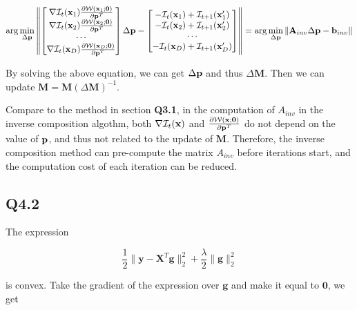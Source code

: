 \documentclass[11pt]{article}
\begin{document}
\begin{equation} \label{inverse_optimization_object}
    \arg\min_{\Delta \mathbf{p}}
    \left \|
    \begin{bmatrix}
        \nabla \mathcal{I}_{t}(\mathbf{x}_1) \frac{\partial\mathcal{W}(\mathbf{x}_1;\mathbf{0})}{\partial \mathbf{p}^T} \\
        \nabla \mathcal{I}_{t}(\mathbf{x}_2) \frac{\partial\mathcal{W}(\mathbf{x}_2;\mathbf{0})}{\partial \mathbf{p}^T} \\
        \cdots\\
        \nabla \mathcal{I}_{t}(\mathbf{x}_D) \frac{\partial\mathcal{W}(\mathbf{x}_D;\mathbf{0})}{\partial \mathbf{p}^T}
    \end{bmatrix}
    \Delta \mathbf{p} -
    \begin{bmatrix}
        - \mathcal{I}_t(\mathbf{x}_1) + \mathcal{I}_{t+1} (\mathbf{x}_1')\\
        - \mathcal{I}_t(\mathbf{x}_2) + \mathcal{I}_{t+1} (\mathbf{x}_2')\\
        \cdots\\
        - \mathcal{I}_t(\mathbf{x}_D) + \mathcal{I}_{t+1} (\mathbf{x}_D')\\
    \end{bmatrix}
    \right \|
    =
    \arg\min_{\Delta \mathbf{p}}
    \| \mathbf{A}_{inv}\Delta\mathbf{p} - \mathbf{b}_{inv} \|
\end{equation}

By solving the above equation, we can get $\Delta \mathbf{p}$ and thus $\Delta \mathbf{M}$. Then we can update $\mathbf{M}=\mathbf{M} (\Delta \mathbf{M})^{-1}$.

Compare to the method in section \textbf{Q3.1}, in the computation of $A_{inv}$ in the inverse composition algothm, both $\nabla \mathcal{I}_{t}(\mathbf{x})$ and $\frac{\partial\mathcal{W}(\mathbf{x};\mathbf{0})}{\partial \mathbf{p}^T}$ do not depend on the value of $\mathbf{p}$, and thus not related to the update of $\mathbf{M}$. Therefore, the inverse composition method can pre-compute the matrix $A_{inv}$ before iterations start, and  the computation cost of each iteration can be reduced.

\newpage
\subsection*{Q4.2}

The expression

\newcommand {\g} {\mathbf{g}}
\newcommand {\X} {\mathbf{X}}
\newcommand {\y} {\mathbf{y}}

\begin{equation}
    \frac{1}{2} \| \y-\X^T \g\|_2^2 + \frac{\lambda}{2} \|\g\|_2^2
\end{equation}

is convex. Take the gradient of the expression over $\g$ and make it equal to $\mathbf{0}$, we get
\end{document}
